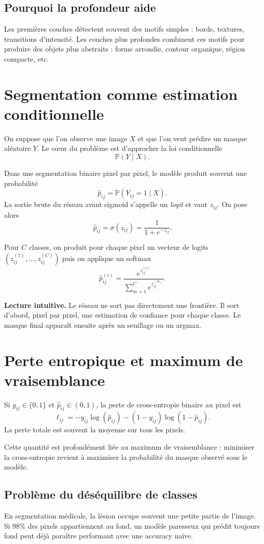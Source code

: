 \documentclass[11pt]{article}
\begin{document}
\subsection{Pourquoi la profondeur aide}
Les premières couches détectent souvent des motifs simples : bords, textures, transitions d'intensité. Les couches plus profondes combinent ces motifs pour produire des objets plus abstraits : forme arrondie, contour organique, région compacte, etc.

\section{Segmentation comme estimation conditionnelle}
On suppose que l'on observe une image $X$ et que l'on veut prédire un masque aléatoire $Y$. Le cœur du problème est d'approcher la loi conditionnelle
\[
\mathbb{P}(Y\mid X).
\]

Dans une segmentation binaire pixel par pixel, le modèle produit souvent une probabilité
\[
\hat p_{ij}=\mathbb{P}(Y_{ij}=1\mid X).
\]
La sortie brute du réseau avant sigmoid s'appelle un \emph{logit} et vaut $z_{ij}$. On pose alors
\[
\hat p_{ij}=\sigma(z_{ij})=\frac{1}{1+e^{-z_{ij}}}.
\]

Pour $C$ classes, on produit pour chaque pixel un vecteur de logits $(z_{ij}^{(1)},\dots,z_{ij}^{(C)})$ puis on applique un softmax
\[
\hat p_{ij}^{(c)}=\frac{e^{z_{ij}^{(c)}}}{\sum_{m=1}^C e^{z_{ij}^{(m)}}}.
\]

\begin{ideaBox}
\textbf{Lecture intuitive.} Le réseau ne sort pas directement une frontière. Il sort d'abord, pixel par pixel, une estimation de confiance pour chaque classe. Le masque final apparaît ensuite après un seuillage ou un argmax.
\end{ideaBox}

\section{Perte entropique et maximum de vraisemblance}
Si $y_{ij}\in\{0,1\}$ et $\hat p_{ij}\in(0,1)$, la perte de cross-entropie binaire au pixel est
\[
\ell_{ij} = -y_{ij}\log(\hat p_{ij})-(1-y_{ij})\log(1-\hat p_{ij}).
\]
La perte totale est souvent la moyenne sur tous les pixels.

Cette quantité est profondément liée au maximum de vraisemblance : minimiser la cross-entropie revient à maximiser la probabilité du masque observé sous le modèle.

\subsection{Problème du déséquilibre de classes}
En segmentation médicale, la lésion occupe souvent une petite partie de l'image. Si 98\% des pixels appartiennent au fond, un modèle paresseux qui prédit toujours \og fond \fg{} peut déjà paraître performant avec une accuracy naïve.
\end{document}
